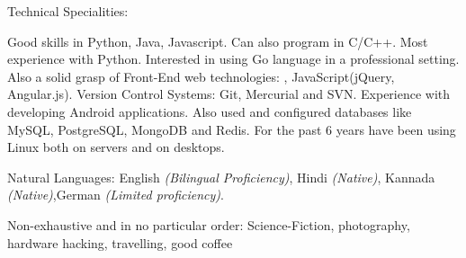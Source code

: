 \documentclass[10pt,a4paper]{article}
\begin{document}
\spacedhrule{0.5em}{-0.4em}


\inlineheadsection  %
  {Technical Specialities:}
  {Good skills in Python, Java, Javascript. Can also program in C/C++. Most experience with Python. Interested in using Go language in a professional setting. Also a solid grasp of Front-End web technologies: , JavaScript(jQuery, Angular.js). Version Control Systems: Git, Mercurial and SVN. Experience with developing Android applications. Also used and configured databases like MySQL, PostgreSQL, MongoDB and Redis. For the past 6 years have been using Linux both on servers and on desktops.

}

\inlineheadsection
  {Natural Languages:}
  {English \emph{(Bilingual Proficiency)}, Hindi \emph{(Native)}, Kannada \emph{(Native)},German \emph{(Limited proficiency)}.}


\spacedhrule{1.6em}{-0.4em}


\inlineheadsection
  {Non-exhaustive and in no particular order:}
  {Science-Fiction, photography, hardware hacking, travelling, good coffee}
\end{document}
